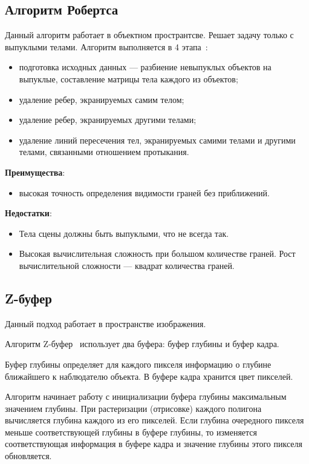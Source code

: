 \subsection{Алгоритм Робертса}

Данный алгоритм работает в объектном пространтсве. Решает задачу только с выпуклыми телами.
Алгоритм выполняется в 4 этапа~\cite{roberts:1964}:
\begin{itemize}
    \item подготовка исходных данных --- разбиение невыпуклых объектов на выпуклые, составление
        матрицы тела каждого из объектов;
    \item удаление ребер, экранируемых самим телом;
    \item удаление ребер, экранируемых другими телами;
    \item удаление линий пересечения тел, экранируемых
        самими телами и другими телами, связанными отношением протыкания.
\end{itemize}



\textbf{Преимущества}:
\begin{itemize}
    \item высокая точность определения видимости граней без приближений.
\end{itemize}


\textbf{Недостатки}:
\begin{itemize}
    \item Тела сцены должны быть выпуклыми, что не всегда так.
    \item Высокая вычислительная сложность при большом количестве граней. Рост
        вычислительной сложности --- квадрат количества граней.
\end{itemize}

\subsection{Z-буфер}

Данный подход работает в пространстве изображения.

Алгоритм Z-буфер~\cite{zbuffer:1974} использует два буфера: буфер глубины и буфер кадра.

Буфер глубины определяет для каждого пикселя информацию о глубине ближайшего к наблюдателю
объекта.  В буфере кадра хранится цвет пикселей.

\medskip

Алгоритм начинает работу с инициализации буфера глубины максимальным значением глубины.
При растеризации (отрисовке) каждого полигона вычисляется глубина каждого из его пикселей.
Если глубина очередного пикселя меньше соответствующей глубины в буфере глубины, то
изменяется соответствующая информация в буфере кадра и значение глубины этого пикселя
обновляется.


